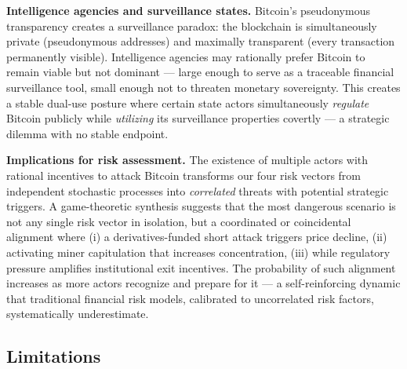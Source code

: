 \documentclass[
  11pt,
]{article}
\let\oldsubsection\subsection
\renewcommand{\subsection}[1]{\FloatBarrier\oldsubsection{#1}}
\begin{document}
\textbf{Intelligence agencies and surveillance states.} Bitcoin's
pseudonymous transparency creates a surveillance paradox: the blockchain
is simultaneously private (pseudonymous addresses) and maximally
transparent (every transaction permanently visible). Intelligence
agencies may rationally prefer Bitcoin to remain viable but not dominant
--- large enough to serve as a traceable financial surveillance tool,
small enough not to threaten monetary sovereignty. This creates a stable
dual-use posture where certain state actors simultaneously
\emph{regulate} Bitcoin publicly while \emph{utilizing} its surveillance
properties covertly --- a strategic dilemma with no stable endpoint.

\textbf{Implications for risk assessment.} The existence of multiple
actors with rational incentives to attack Bitcoin transforms our four
risk vectors from independent stochastic processes into
\emph{correlated} threats with potential strategic triggers. A
game-theoretic synthesis suggests that the most dangerous scenario is
not any single risk vector in isolation, but a coordinated or
coincidental alignment where (i) a derivatives-funded short attack
triggers price decline, (ii) activating miner capitulation that
increases concentration, (iii) while regulatory pressure amplifies
institutional exit incentives. The probability of such alignment
increases as more actors recognize and prepare for it --- a
self-reinforcing dynamic that traditional financial risk models,
calibrated to uncorrelated risk factors, systematically underestimate.

\hypertarget{limitations-1}{%
\subsection{Limitations}\label{limitations-1}}
\end{document}
